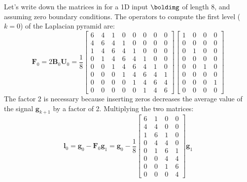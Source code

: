 Let's write down the matrices in \eqn{\ref{eqn:laplacian_pyr_coef}} for a 1D input $\boldimg$ of length 8, and assuming zero boundary conditions. The operators to compute the first level ($k=0$) of the Laplacian pyramid are:
\begin{equation}
\mathbf{F}_0 =  2 \mathbf{B}_0 \mathbf{U}_0 =
 \frac{1}{8}
 \begin{bmatrix}
  6 ~& 4 ~& 1 ~& 0 ~& 0 ~& 0 ~& 0 ~& 0 \\
  4 ~& 6 ~& 4 ~& 1 ~& 0 ~& 0 ~& 0 ~& 0 \\
  1 ~& 4 ~& 6 ~& 4 ~& 1 ~& 0 ~& 0 ~& 0 \\
  0 ~& 1 ~& 4 ~& 6 ~& 4 ~& 1 ~& 0 ~& 0 \\
  0 ~& 0 ~& 1 ~& 4 ~& 6 ~& 4 ~& 1 ~& 0 \\
  0 ~& 0 ~& 0 ~& 1 ~& 4 ~& 6 ~& 4 ~& 1 \\
  0 ~& 0 ~& 0 ~& 0 ~& 1 ~& 4 ~& 6 ~& 4 \\
  0 ~& 0 ~& 0 ~& 0 ~& 0 ~& 1 ~& 4 ~& 6 
\end{bmatrix}
 \begin{bmatrix}
  1 ~& 0 ~& 0  ~& 0\\
  0 ~& 0 ~& 0  ~& 0\\
  0 ~& 1 ~& 0  ~& 0\\
  0 ~& 0 ~& 0  ~& 0\\
  0 ~& 0 ~& 1  ~& 0\\
  0 ~& 0 ~& 0  ~& 0\\
  0 ~& 0 ~& 0  ~& 1\\
  0 ~& 0 ~& 0  ~& 0
\end{bmatrix}
 \end{equation}
The factor 2 is necessary because inserting zeros decreases the average value of the signal $\mathbf{g}_{k+1}$ by a factor of 2. Multiplying the two matrices:
\begin{equation}
\mathbf{l}_{0} = \mathbf{g}_0 - \mathbf{F}_0 \mathbf{g}_{1} = 
 \mathbf{g}_0 - \frac{1}{8}
 \begin{bmatrix}
  6 ~& 1 ~& 0  ~& 0\\
  4 ~& 4 ~& 0  ~& 0\\
  1 ~& 6 ~& 1  ~& 0\\
  0 ~& 4 ~& 4  ~& 0\\
  0 ~& 1 ~& 6  ~& 1\\
  0 ~& 0 ~& 4  ~& 4\\
  0 ~& 0 ~& 1  ~& 6\\
  0 ~& 0 ~& 0  ~& 4
\end{bmatrix}
 \mathbf{g}_{1}
 \end{equation}
